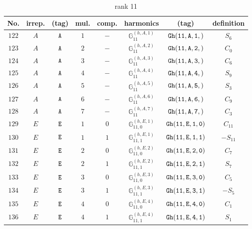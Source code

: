 \documentclass[fleqn,8pt]{jsarticle}
\begin{document}
\begin{table}[ht!]
\begin{center}
\caption{rank 11}
\renewcommand{\arraystretch}{1.3}
\begin{tabular}{cccccccc} \hline \hline
No. & irrep. & (tag) & mul. & comp. & harmonics & (tag) & definition \\ \hline
$ 122 $ & $ A $ & $ {\tt A} $ & $ 1 $ & $ - $ & $ \mathbb{G}_{11}^{(h,A,1)} $ & $ {\tt Gh(11,A,1,)} $ & $ S_{6} $ \\
$ 123 $ & $ A $ & $ {\tt A} $ & $ 2 $ & $ - $ & $ \mathbb{G}_{11}^{(h,A,2)} $ & $ {\tt Gh(11,A,2,)} $ & $ C_{0} $ \\
$ 124 $ & $ A $ & $ {\tt A} $ & $ 3 $ & $ - $ & $ \mathbb{G}_{11}^{(h,A,3)} $ & $ {\tt Gh(11,A,3,)} $ & $ C_{6} $ \\
$ 125 $ & $ A $ & $ {\tt A} $ & $ 4 $ & $ - $ & $ \mathbb{G}_{11}^{(h,A,4)} $ & $ {\tt Gh(11,A,4,)} $ & $ S_{9} $ \\
$ 126 $ & $ A $ & $ {\tt A} $ & $ 5 $ & $ - $ & $ \mathbb{G}_{11}^{(h,A,5)} $ & $ {\tt Gh(11,A,5,)} $ & $ S_{3} $ \\
$ 127 $ & $ A $ & $ {\tt A} $ & $ 6 $ & $ - $ & $ \mathbb{G}_{11}^{(h,A,6)} $ & $ {\tt Gh(11,A,6,)} $ & $ C_{9} $ \\
$ 128 $ & $ A $ & $ {\tt A} $ & $ 7 $ & $ - $ & $ \mathbb{G}_{11}^{(h,A,7)} $ & $ {\tt Gh(11,A,7,)} $ & $ C_{3} $ \\
$ 129 $ & $ E $ & $ {\tt E} $ & $ 1 $ & $ 0 $ & $ \mathbb{G}_{11,0}^{(h,E,1)} $ & $ {\tt Gh(11,E,1,0)} $ & $ C_{11} $ \\
$ 130 $ & $ E $ & $ {\tt E} $ & $ 1 $ & $ 1 $ & $ \mathbb{G}_{11,1}^{(h,E,1)} $ & $ {\tt Gh(11,E,1,1)} $ & $ - S_{11} $ \\
$ 131 $ & $ E $ & $ {\tt E} $ & $ 2 $ & $ 0 $ & $ \mathbb{G}_{11,0}^{(h,E,2)} $ & $ {\tt Gh(11,E,2,0)} $ & $ C_{7} $ \\
$ 132 $ & $ E $ & $ {\tt E} $ & $ 2 $ & $ 1 $ & $ \mathbb{G}_{11,1}^{(h,E,2)} $ & $ {\tt Gh(11,E,2,1)} $ & $ S_{7} $ \\
$ 133 $ & $ E $ & $ {\tt E} $ & $ 3 $ & $ 0 $ & $ \mathbb{G}_{11,0}^{(h,E,3)} $ & $ {\tt Gh(11,E,3,0)} $ & $ C_{5} $ \\
$ 134 $ & $ E $ & $ {\tt E} $ & $ 3 $ & $ 1 $ & $ \mathbb{G}_{11,1}^{(h,E,3)} $ & $ {\tt Gh(11,E,3,1)} $ & $ - S_{5} $ \\
$ 135 $ & $ E $ & $ {\tt E} $ & $ 4 $ & $ 0 $ & $ \mathbb{G}_{11,0}^{(h,E,4)} $ & $ {\tt Gh(11,E,4,0)} $ & $ C_{1} $ \\
$ 136 $ & $ E $ & $ {\tt E} $ & $ 4 $ & $ 1 $ & $ \mathbb{G}_{11,1}^{(h,E,4)} $ & $ {\tt Gh(11,E,4,1)} $ & $ S_{1} $ \\

\end{tabular}
\end{center}
\end{table}
\end{document}
